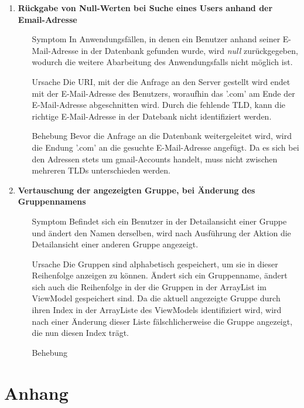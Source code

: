 \documentclass[11pt,a4paper]{scrartcl}
\def\threedigits#1{%
  \ifnum#1<100 0\fi
  \ifnum#1<10 0\fi
  \number#1}
\begin{document}
\begin{enumerate}[label={\textbf{/B\protect\threedigits{\theenumi}0/}}, leftmargin=*]
\item \textbf{Rückgabe von Null-Werten bei Suche eines Users anhand der Email-Adresse}
	\begin{itemize}
		\item[Symptom] In Anwendungsfällen, in denen ein Benutzer anhand seiner E-Mail-Adresse in der Datenbank gefunden wurde, wird \textit{null} zurückgegeben, wodurch die weitere Abarbeitung des Anwendungsfalls nicht möglich ist.
		\item[Ursache] Die URI, mit der die Anfrage an den Server gestellt wird endet mit der E-Mail-Adresse des Benutzers, woraufhin das '.com' am Ende der E-Mail-Adresse abgeschnitten wird. Durch die fehlende TLD, kann die richtige E-Mail-Adresse in der Datebank nicht identifiziert werden.
		\item[Behebung] Bevor die Anfrage an die Datenbank weitergeleitet wird, wird die Endung '.com' an die gesuchte E-Mail-Adresse angefügt. Da es sich bei den Adressen stets um gmail-Accounts handelt, muss nicht zwischen mehreren TLDs unterschieden werden.
	\end{itemize}
	
\item \textbf{Vertauschung der angezeigten Gruppe, bei Änderung des Gruppennamens}
	\begin{itemize}
		\item[Symptom] Befindet sich ein Benutzer in der Detailansicht einer Gruppe und ändert den Namen derselben, wird nach Ausführung der Aktion die Detailansicht einer anderen Gruppe angezeigt.
		\item[Ursache] Die Gruppen sind alphabetisch gespeichert, um sie in dieser Reihenfolge anzeigen zu können. Ändert sich ein Gruppenname, ändert sich auch die Reihenfolge in der die Gruppen in der ArrayList im ViewModel gespeichert sind. Da die aktuell angezeigte Gruppe durch ihren Index in der ArrayListe des ViewModels identifiziert wird, wird nach einer Änderung dieser Liste fälschlicherweise die Gruppe angezeigt, die nun diesen Index trägt.
		\item[Behebung] %
	\end{itemize}

\end{enumerate}

\newpage

\section{Anhang}
\end{document}
